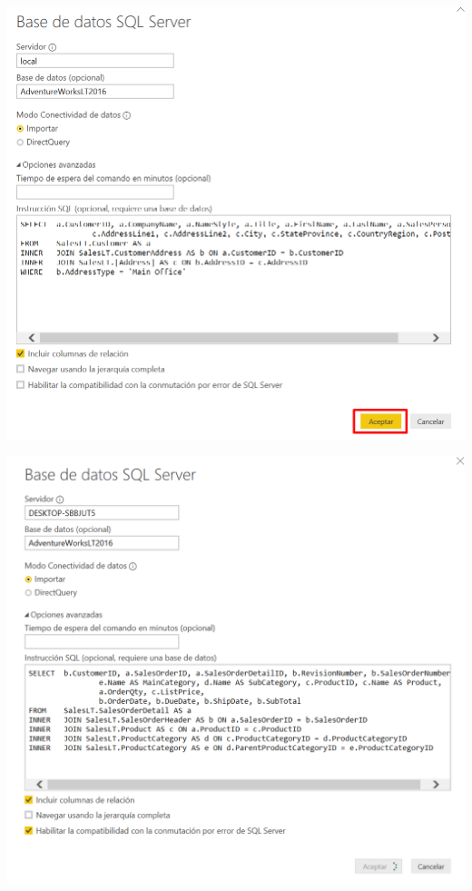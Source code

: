 \begin{itemize}
\begin{enumerate}
\begin{center}
\includegraphics[scale=0.55]{./Imagenes/7.png}
\end{center}

\begin{center}
\includegraphics[scale=0.55]{./Imagenes/9.png}
\end{center}


\end{enumerate}
\end{itemize}
